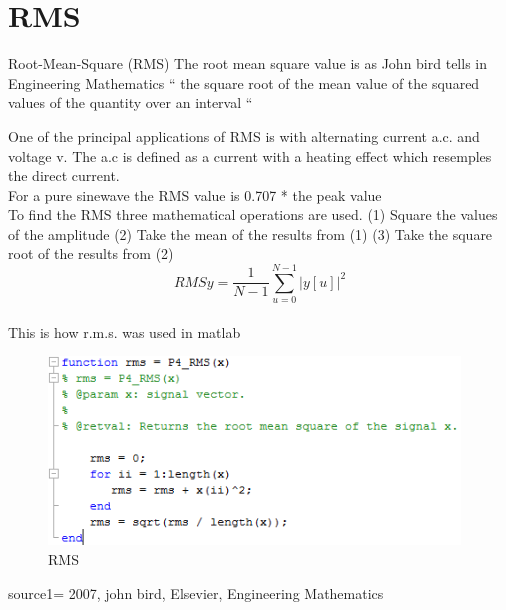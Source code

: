 \section{RMS}
Root-Mean-Square (RMS)
The root mean square value is as John bird tells in Engineering Mathematics \citep{Bird2007
} “ the square root of the mean value of the squared values of the quantity over an interval “


One of the principal applications of RMS is with alternating current a.c. and voltage v. The a.c is defined as a current with a heating effect which resemples the direct current. \citep{Bird2007}
\\
For a pure sinewave the RMS value is 0.707 * the peak value
\\
To find the RMS three mathematical operations are used.
(1)	Square the values of the amplitude
(2)	Take the mean of the results from (1)
(3)	Take the square root of the results from (2)
\begin{equation}\label{eq:RMS formular}
RMSy = \frac{1}{N-1}\sum_{u=0}^{N-1}|y[u]|^2
\end{equation}
\\
This is how r.m.s. was used in matlab
\begin{figure}
	\begin{center}
		\includegraphics[height=5cm]{fig/RMS_matlabCode.png}
		\caption{RMS}
	\end{center}
\end{figure}

source1= 2007, john bird, Elsevier, Engineering Mathematics